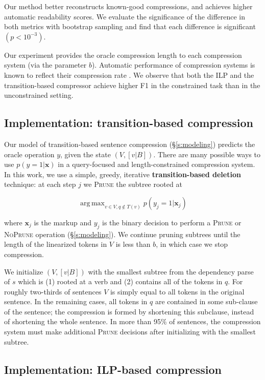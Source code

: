 \documentclass[11pt,a4paper]{article}
\DeclareMathOperator*{\argmaxA}{arg\,max} %
\begin{document}
Our method better reconstructs known-good compressions, and achieves higher automatic readability scores. We evaluate the significance of the difference in both metrics with bootstrap sampling \cite{D12-1091} and find that each difference is significant {\small $(p < 10^{-3})$}. 

Our experiment provides the oracle compression length to each compression system (via the parameter $b$). Automatic performance of compression systems is known to reflect their compression rate \cite{napoles2011evaluating}. We observe that both the ILP and the transition-based compressor achieve higher F1 in the constrained task than in the unconstrained setting.

\subsection{Implementation: transition-based compression}\label{s:transition}

Our model of transition-based sentence compression (\S\ref{s:modeling}) predicts the oracle operation $y$, given the state $(V,[v|B])$. There are many possible ways to use $p(y=1| \bm{x})$ in a query-focused and length-constrained compression system. In this work, we use a simple, greedy, iterative \textbf{transition-based deletion} technique: at each step $j$ we \textsc{Prune} the subtree rooted at 

$$\argmaxA_{v \in V,q\not\in T(v)}   p(y_j = 1 | \bm{x}_j)$$

\noindent where $\bm{x}_j$ is the markup and $y_j$ is the binary decision to perform a \textsc{Prune} or \textsc{NoPrune} operation (\S\ref{s:modeling}). We continue pruning subtrees until the length of the linearized tokens in $V$ is less than $b$, in which case we stop compression. 

We initialize $(V, [v|B])$ with the smallest subtree from the dependency parse of $s$ which is (1) rooted at a verb and (2) contains all of the tokens in $q$. For roughly two-thirds of sentences $V$ is simply equal to all tokens in the original sentence. In the remaining cases, all tokens in $q$ are contained in some sub-clause of the sentence; the compression is formed by shortening this subclause, instead of shortening the whole sentence. In more than 95\% of sentences, the compression system must make additional \textsc{Prune} decisions after initializing with the smallest subtree.

\subsection{Implementation: ILP-based compression}\label{s:ilp}
\end{document}

